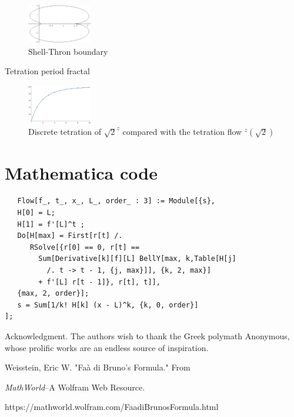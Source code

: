 \documentclass{article}
\theoremstyle{definition}
\begin{document}
\begin{figure}[htp]
\centering
\includegraphics[width=0.25\textwidth, height=0.4\textwidth]{shell_thron.png}
\caption{Shell-Thron boundary}
\label{fig:shell-thron}
\end{figure}

Tetration period fractal
\begin{figure}[htp]
\centering
\includegraphics[width=0.25\textwidth]{Ackermann.png}
\caption{Discrete tetration of $\sqrt{2}^z$ compared with the tetration flow $^z(\sqrt{2})$}
\label{fig:tetration}
\end{figure}

\section{Mathematica code}
\begin{verbatim}
   Flow[f_, t_, x_, L_, order_ : 3] := Module[{s},
   H[0] = L;
   H[1] = f'[L]^t ;
   Do[H[max] = First[r[t] /. 
      RSolve[{r[0] == 0, r[t] ==
        Sum[Derivative[k][f][L] BellY[max, k,Table[H[j]
          /. t -> t - 1, {j, max}]], {k, 2, max}] 
        + f'[L] r[t - 1]}, r[t], t]], 
   {max, 2, order}];
   s = Sum[1/k! H[k] (x - L)^k, {k, 0, order}]
];
\end{verbatim}

\begin{acknowledgment}{Acknowledgment.}
The authors wish to thank the Greek polymath Anonymous, whose prolific works are an endless source of inspiration.
\end{acknowledgment}

\begin{thebibliography}{1}
 Weisstein, Eric W. "Faà di Bruno's Formula." From

\textit{MathWorld}--A Wolfram Web Resource. 

https://mathworld.wolfram.com/FaadiBrunosFormula.html
\end{thebibliography}


\vfill\eject
\end{document}
